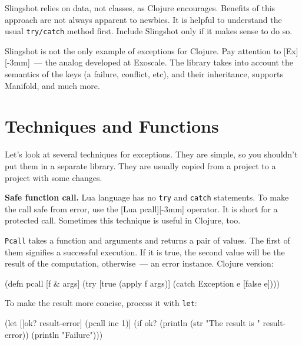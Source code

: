 \fi

Slingshot relies on data, not classes, as Clojure encourages. Benefits of this approach are not always apparent to newbies. It is helpful to understand the usual \verb|try/catch| method first. Include Slingshot only if it makes sense to do so.


Slingshot is not the only example of exceptions for Clojure. Pay attention to [Ex][-3mm]~--- the analog developed at Exoscale. The library takes into account the semantics of the keys (a failure, conflict, etc), and their inheritance, supports Manifold, and much more.

\section{Techniques and Functions}

Let's look at several techniques for exceptions. They are simple, so you shouldn't put them in a separate library. They are usually copied from a project to a project with some changes.


\label{pcall}

\textbf{Safe function call.} Lua language has no \verb|try| and \verb|catch| statements. To make the call safe from error, use the [Lua pcall][-3mm] operator. It is short for a protected call. Sometimes this technique is useful in Clojure, too.

\verb|Pcall| takes a function and arguments and returns a pair of values. The first of them signifies a successful execution. If it is true, the second value will be the result of the computation, otherwise~--- an error instance. Clojure version:


\begin{clojure}
(defn pcall [f & args]
  (try
    [true (apply f args)]
    (catch Exception e [false e])))
\end{clojure}

To make the result more concise, process it with \verb|let|:

\ifnarrow

\begin{clojure}
(let [[ok? result-error] (pcall inc 1)]
  (if ok?
    (println
      (str "The result is "
        result-error))
    (println "Failure")))
\end{clojure}

